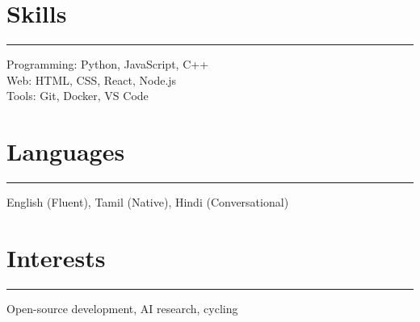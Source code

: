 \documentclass[11pt]{article}
\begin{document}
\vspace{-0.5\baselineskip}
\section*{Skills}
\hrule
Programming: Python, JavaScript, C++ \\
Web: HTML, CSS, React, Node.js \\
Tools: Git, Docker, VS Code

\vspace{-0.5\baselineskip}
\section*{Languages}
\hrule
English (Fluent), Tamil (Native), Hindi (Conversational)

\vspace{-0.5\baselineskip}
\section*{Interests}
\hrule
Open-source development, AI research, cycling
\end{document}

